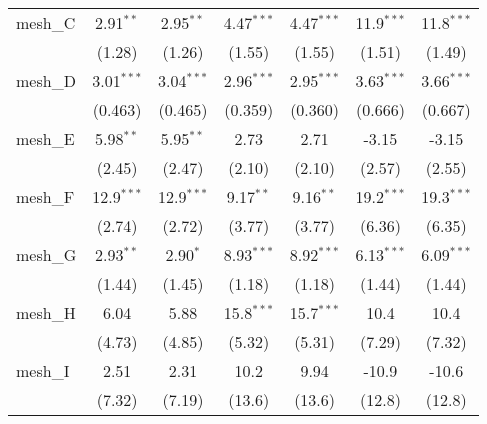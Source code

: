 \begin{tabular}{lcccccc}
   mesh\_C                                                     & 2.91$^{**}$   & 2.95$^{**}$   & 4.47$^{***}$  & 4.47$^{***}$  & 11.9$^{***}$  & 11.8$^{***}$\\   
                                                               & (1.28)        & (1.26)        & (1.55)        & (1.55)        & (1.51)        & (1.49)\\   
   mesh\_D                                                     & 3.01$^{***}$  & 3.04$^{***}$  & 2.96$^{***}$  & 2.95$^{***}$  & 3.63$^{***}$  & 3.66$^{***}$\\   
                                                               & (0.463)       & (0.465)       & (0.359)       & (0.360)       & (0.666)       & (0.667)\\   
   mesh\_E                                                     & 5.98$^{**}$   & 5.95$^{**}$   & 2.73          & 2.71          & -3.15         & -3.15\\   
                                                               & (2.45)        & (2.47)        & (2.10)        & (2.10)        & (2.57)        & (2.55)\\   
   mesh\_F                                                     & 12.9$^{***}$  & 12.9$^{***}$  & 9.17$^{**}$   & 9.16$^{**}$   & 19.2$^{***}$  & 19.3$^{***}$\\   
                                                               & (2.74)        & (2.72)        & (3.77)        & (3.77)        & (6.36)        & (6.35)\\   
   mesh\_G                                                     & 2.93$^{**}$   & 2.90$^{*}$    & 8.93$^{***}$  & 8.92$^{***}$  & 6.13$^{***}$  & 6.09$^{***}$\\   
                                                               & (1.44)        & (1.45)        & (1.18)        & (1.18)        & (1.44)        & (1.44)\\   
   mesh\_H                                                     & 6.04          & 5.88          & 15.8$^{***}$  & 15.7$^{***}$  & 10.4          & 10.4\\   
                                                               & (4.73)        & (4.85)        & (5.32)        & (5.31)        & (7.29)        & (7.32)\\   
   mesh\_I                                                     & 2.51          & 2.31          & 10.2          & 9.94          & -10.9         & -10.6\\   
                                                               & (7.32)        & (7.19)        & (13.6)        & (13.6)        & (12.8)        & (12.8)\\   

\end{tabular}
